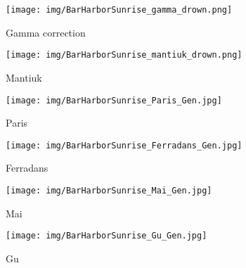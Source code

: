 \documentclass[journal]{IEEEtran}
\begin{document}
\begin{figure*}[tb]
        \centering
        \begin{subfigure}[b]{0.245\textwidth}
            \centering
            \texttt{[image: img/BarHarborSunrise\_gamma\_drown.png]}
            \caption[]%
            {{\small Gamma correction }}    
            \label{fig:mean and std of net14}
        \end{subfigure}
        \begin{subfigure}[b]{0.245\textwidth}  
            \centering 
            \texttt{[image: img/BarHarborSunrise\_mantiuk\_drown.png]}
            \caption[]%
            {{\small Mantiuk \cite{mantiuk2008display} }}    
            \label{fig:mean and std of net24}
        \end{subfigure}
        \begin{subfigure}[b]{0.245\textwidth}   
            \centering 
            \texttt{[image: img/BarHarborSunrise\_Paris\_Gen.jpg]}
            \caption[]%
            {{\small Paris\cite{paris2015local} }}    
            \label{fig:mean and std of net34}
        \end{subfigure}
        \begin{subfigure}[b]{0.245\textwidth}   
            \centering 
            \texttt{[image: img/BarHarborSunrise\_Ferradans\_Gen.jpg]}
            \caption[]%
            {{\small Ferradans \cite{ferradans2011analysis}     }}    
            \label{fig:mean and std of net44}
        \end{subfigure}
        \label{fig:mean and std of nets}
        \centering
        \begin{subfigure}[b]{0.245\textwidth}
            \centering
            \texttt{[image: img/BarHarborSunrise\_Mai\_Gen.jpg]} 
            \caption[]%
            {{\small Mai \cite{mai2011optimizing} }}    
            \label{fig:mean and std of net14}
        \end{subfigure}
        \begin{subfigure}[b]{0.245\textwidth}  
            \centering 
            \texttt{[image: img/BarHarborSunrise\_Gu\_Gen.jpg]}
            \caption[]%
            {{\small Gu \cite{gu2013local} }}    
            \label{fig:mean and std of net24}
        \end{subfigure}

\end{figure*}
\end{document}
